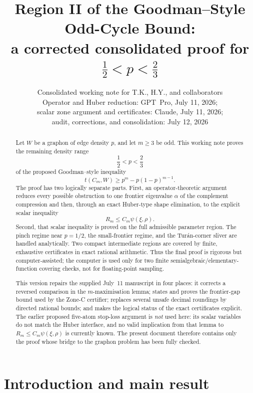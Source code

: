 \documentclass[11pt]{article}
\title{Region II of the Goodman--Style Odd-Cycle Bound:\\
a corrected consolidated proof for $\tfrac12<p<\tfrac23$}
\author{Consolidated working note for T.K., H.Y., and collaborators\\[1mm]
\normalsize Operator and Huber reduction: GPT~Pro, July 11, 2026;\\
\normalsize scalar zone argument and certificates: Claude, July 11, 2026;\\
\normalsize audit, corrections, and consolidation: July 12, 2026}
\date{}
\begin{document}
\maketitle

\begin{abstract}
Let $W$ be a graphon of edge density $p$, and let $m\ge3$ be odd.  This
working note proves the remaining density range
\[
        \frac12<p<\frac23
\]
of the proposed Goodman--style inequality
\[
        t(C_m,W)\ge p^m-p(1-p)^{m-1}.
\]
The proof has two logically separate parts.  First, an operator-theoretic
argument reduces every possible obstruction to one frontier eigenvalue
$\alpha$ of the complement compression and then, through an exact Huber-type
shape elimination, to the explicit scalar inequality
\[
        R_m\le C_m\psi(\xi,\rho).
\]
Second, that scalar inequality is proved on the full admissible parameter
region.  The pinch regime near $p=1/2$, the small-frontier regime, and the
Tur\'an-corner sliver are handled analytically.  Two compact intermediate
regions are covered by finite, exhaustive certificates in exact rational
arithmetic.  Thus the final proof is rigorous but computer-assisted; the
computer is used only for two finite semialgebraic/elementary-function
covering checks, not for floating-point sampling.

This version repairs the supplied July~11 manuscript in four places: it
corrects a reversed comparison in the $m$-maximisation lemma; states and
proves the frontier-gap bound used by the Zone-C certifier; replaces several
unsafe decimal roundings by directed rational bounds; and makes the logical
status of the exact certificates explicit.  The earlier proposed five-atom
stop-loss argument is \emph{not} used here: its scalar variables do not match
the Huber interface, and no valid implication from that lemma to
$R_m\le C_m\psi(\xi,\rho)$ is currently known.  The present document therefore
contains only the proof whose bridge to the graphon problem has been fully
checked.
\end{abstract}

{\small\tableofcontents}

\section{Introduction and main result}\label{sec:intro}
\end{document}
